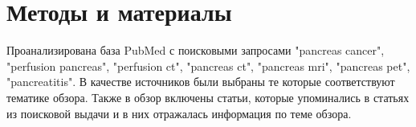 \section{Методы и материалы}
Проанализирована база PubMed с поисковыми запросами "pancreas cancer", "perfusion pancreas", "perfusion ct", "pancreas ct", "pancreas mri", "pancreas pet", "pancreatitis". В качестве источников были выбраны те которые соответствуют тематике обзора. Также в обзор включены статьи, которые упоминались в статьях из поисковой выдачи и в них отражалась информация по теме обзора.

